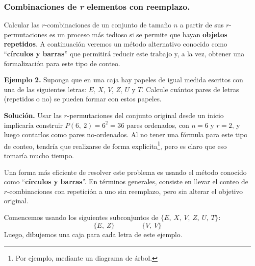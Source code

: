 \documentclass[12pt]{article}
\begin{document}
\subsubsection{Combinaciones de \textit{r} elementos con reemplazo.}

Calcular las $r$-combinaciones de un conjunto de tamaño $n$ a partir de sus $r$-permutaciones es un proceso más tedioso si se permite que hayan \textbf{objetos repetidos}. A continuación veremos un método alternativo conocido como ``\textbf{círculos y barras}'' que permitirá reducir este trabajo y, a la vez, obtener una formalización para este tipo de conteo.

\textbf{Ejemplo 2.} Suponga que en una caja hay papeles de igual medida escritos con una de las siguientes letras: $E$, $X$, $V$, $Z$, $U$ y $T$. Calcule cuántos pares de letras (repetidos o no) se pueden formar con estos papeles.

\textbf{Solución.} Usar las $r$-permutaciones del conjunto original desde un inicio implicaría construir $P(6, \ 2) = 6^{2} = 36$ pares ordenados, con $n = 6$ y $r = 2$, y luego contarlos como pares no-ordenados. Al no tener una fórmula para este tipo de conteo, tendría que realizarse de forma explícita\footnote{Por ejemplo, mediante un diagrama de árbol.}, pero es claro que eso tomaría mucho tiempo.

Una forma más eficiente de resolver este problema es usando el método conocido como ``\textbf{círculos y barras}''. En términos generales, consiste en llevar el conteo de $r$-combinaciones con repetición a uno sin reemplazo, pero sin alterar el objetivo original.

Comencemos usando los siguientes subconjuntos de $\{E, \ X, \ V, \ Z, \ U, \ T\}$:
\[
  \{E, \ Z\} \qquad \qquad \{V, \ V\}
\]
Luego, dibujemos una caja para cada letra de este ejemplo.

\begin{figure}[hbt!]
\centering


\end{figure}
\end{document}
